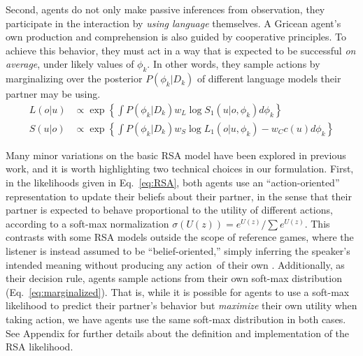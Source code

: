Second, agents do not only make passive inferences from observation, they participate in the interaction by \emph{using language} themselves.
A Gricean agent's own production and comprehension is also guided by cooperative principles.
To achieve this behavior, they must act in a way that is expected to be successful \emph{on average}, under likely values of $\phi_k$.
In other words, they sample actions by marginalizing over the posterior $P(\phi_k | D_k)$ of different language models their partner may be using.
\begin{align}
L(o|u) &\propto   \exp\left\{ \textstyle{\int} P(\phi_k | D_k) w_L \log S_1(u|o, \phi_k)d\phi_k\right\}\label{eq:marginalized}\\
S(u|o) &\propto  \exp\left\{ \textstyle{\int} P(\phi_k | D_k)  w_S \log L_1(o| u, \phi_k) - w_C c(u)d\phi_k\right\}\nonumber
\end{align}

Many minor variations on the basic RSA model have been explored in previous work, and it is worth highlighting two technical choices in our formulation.
First, in the likelihoods given in Eq.~\ref{eq:RSA}, both agents use an ``action-oriented'' representation to update their beliefs about their partner, in the sense that their partner is expected to behave proportional to the utility of different actions, according to a soft-max normalization $\sigma(U(z)) = e^{U(z)}/\sum e^{U(z)}$.
This contrasts with some RSA models outside the scope of reference games, where the listener is instead assumed to be ``belief-oriented,'' simply inferring the speaker's intended meaning without producing any action of their own \cite{qing2015variations}.
Additionally, as their decision rule, agents sample actions from their own soft-max distribution (Eq.~\ref{eq:marginalized}).
That is, while it is possible for agents to use a soft-max likelihood to predict their partner's behavior but \emph{maximize} their own utility when taking action, we have agents use the same soft-max distribution in both cases.
See Appendix for further details about the definition and implementation of the RSA likelihood.


